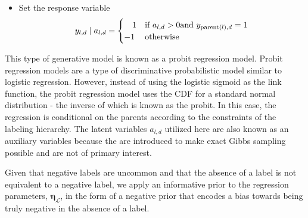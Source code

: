 \begin{enumerate}
\begin{itemize}
\begin{itemize}
\item Set the response variable \[
y_{l,d}\mid a_{l,d}=\begin{cases}
\ \ \ 1 & \text{if \ensuremath{a_{l,d}>0}and \ensuremath{y_{{\rm parent}(l),d}=1}}\\
-1 & \text{otherwise}\end{cases}\]
 
\end{itemize}
\end{itemize}
\end{enumerate}
This type of generative model is known as a probit regression model.
Probit regression models are a type of discriminative probabilistic
model similar to logistic regression. However, instead of using the
logistic sigmoid as the link function, the probit regression model
uses the CDF for a standard normal distribution - the inverse of which
is known as the probit. In this case, the regression is conditional
on the parents according to the constraints of the labeling hierarchy.
The latent variables $a_{l,d}$ utilized here are also known as an
auxiliary variables because the are introduced to make exact Gibbs
sampling possible and are not of primary interest.

Given that negative labels are uncommon and that the absence of a
label is not equivalent to a negative label, we apply an informative
prior to the regression parameters, $\mathbf{\eta}_{\mathcal{L}}$,
in the form of a negative prior that encodes a bias towards being
truly negative in the absence of a label.

